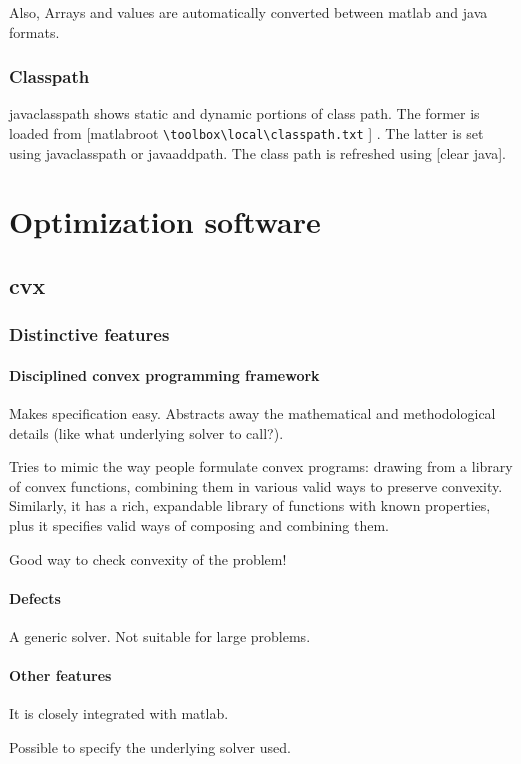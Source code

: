 \documentclass[oneside, article]{memoir}
\begin{document}
Also, Arrays and values are automatically converted between matlab and java formats.


\subsection{Classpath}
javaclasspath shows static and dynamic portions of class path. The former is loaded from [matlabroot \verb '\toolbox\local\classpath.txt' ]
. The latter is set using javaclasspath or javaaddpath. The class path is refreshed using [clear java].

\chapter{Optimization software}
\section{cvx}
\subsection{Distinctive features}
\subsubsection{Disciplined convex programming framework}
Makes specification easy. Abstracts away the mathematical and methodological details (like what underlying solver to call?).

Tries to mimic the way people formulate convex programs: drawing from a library of convex functions, combining them in various valid ways to preserve convexity. Similarly, it has a rich, expandable library of functions with known properties, plus it specifies valid ways of composing and combining them.

Good way to check convexity of the problem!

\subsubsection{Defects}
A generic solver. Not suitable for large problems.

\subsubsection{Other features}
It is closely integrated with matlab.

Possible to specify the underlying solver used.
\end{document}
